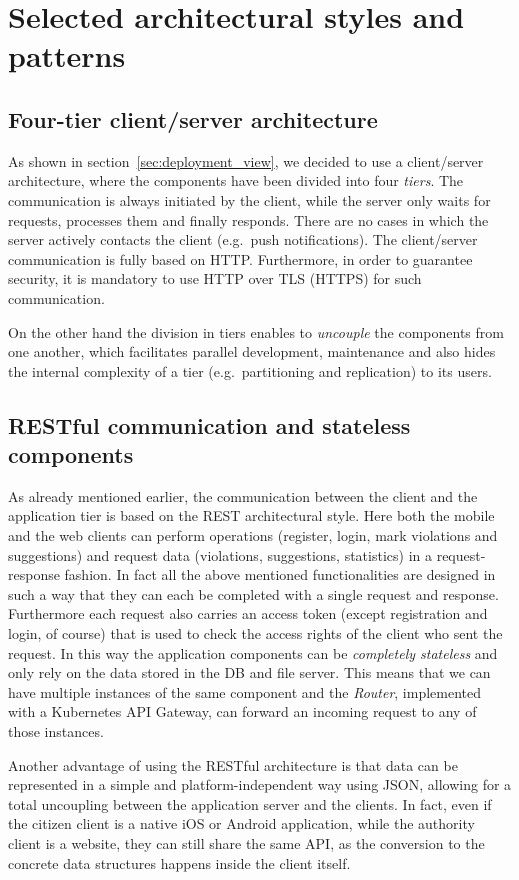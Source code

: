 \section{Selected architectural styles and patterns}
\label{sec:styles_patterns}
\subsection{Four-tier client/server architecture}
As shown in section~\ref{sec:deployment_view}, we decided to use a client/server
architecture, where the components have been divided into four \emph{tiers}.
The communication is always initiated by the client, while the server only
waits for requests, processes them and finally responds. There are no cases
in which the server actively contacts the client (e.g.\ push notifications).
The client/server communication is fully based on HTTP.
Furthermore, in order to guarantee security, it is mandatory to use HTTP over
TLS (HTTPS) for such communication.

On the other hand the division in tiers enables to \emph{uncouple} the
components from one another, which facilitates parallel development, maintenance
and also hides the internal complexity of a tier (e.g.\ partitioning and
replication) to its users.

\subsection{RESTful communication and stateless components}
As already mentioned earlier, the communication between the client and the
application tier is based on the REST architectural style. Here both the mobile
and the web clients can perform operations (register, login, mark violations and
suggestions) and request data (violations, suggestions, statistics) in a
request-response fashion. In fact all the above mentioned functionalities are
designed in such a way that they can each be completed with a single request and
response. Furthermore each request also carries an access token (except
registration and login, of course) that is used to check the access rights of
the client who sent the request.
In this way the application components can be \emph{completely stateless} and
only rely on the data stored in the DB and file server.
This means that we can have multiple instances of the same component and the
\emph{Router}, implemented with a Kubernetes API Gateway, can forward an
incoming request to any of those instances.

Another advantage of using the RESTful architecture is that data can be
represented in a simple and platform-independent way using JSON, allowing for
a total uncoupling between the application server and the clients.
In fact, even if the citizen client is a native iOS or Android application,
while the authority client is a website, they can still share the same API,
as the conversion to the concrete data structures happens inside the client
itself.

